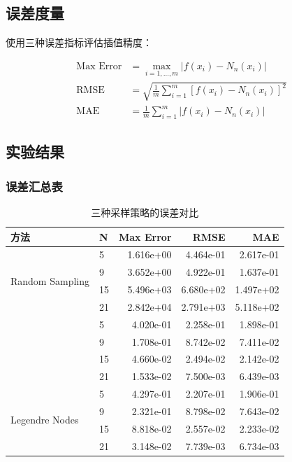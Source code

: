 \documentclass[a4paper,12pt]{article}
\theoremstyle{definition}
\begin{document}
\subsection{误差度量}

使用三种误差指标评估插值精度：

\begin{align}
\text{Max Error} &= \max_{i=1,\ldots,m}|f(x_i) - N_n(x_i)| \\
\text{RMSE} &= \sqrt{\frac{1}{m}\sum_{i=1}^{m}[f(x_i) - N_n(x_i)]^2} \\
\text{MAE} &= \frac{1}{m}\sum_{i=1}^{m}|f(x_i) - N_n(x_i)|
\end{align}

\subsection{实验结果}

\subsubsection{误差汇总表}

\begin{table}[H]
\centering
\caption{三种采样策略的误差对比}
\label{tab:task1_errors}
\begin{tabular}{llrrr}
\toprule
\textbf{方法} & \textbf{N} & \textbf{Max Error} & \textbf{RMSE} & \textbf{MAE} \\
\midrule
\multirow{4}{*}{Random Sampling}
& 5  & 1.616e+00 & 4.464e-01 & 2.617e-01 \\
& 9  & 3.652e+00 & 4.922e-01 & 1.637e-01 \\
& 15 & 5.496e+03 & 6.680e+02 & 1.497e+02 \\
& 21 & 2.842e+04 & 2.791e+03 & 5.118e+02 \\
\midrule
\rowcolor{tablerowcolor}
\multirow{4}{*}{Chebyshev Nodes}
& 5  & 4.020e-01 & 2.258e-01 & 1.898e-01 \\
& 9  & 1.708e-01 & 8.742e-02 & 7.411e-02 \\
& 15 & 4.660e-02 & 2.494e-02 & 2.142e-02 \\
& 21 & 1.533e-02 & 7.500e-03 & 6.439e-03 \\
\midrule
\multirow{4}{*}{Legendre Nodes}
& 5  & 4.297e-01 & 2.207e-01 & 1.906e-01 \\
& 9  & 2.321e-01 & 8.798e-02 & 7.643e-02 \\
& 15 & 8.818e-02 & 2.557e-02 & 2.233e-02 \\
& 21 & 3.148e-02 & 7.739e-03 & 6.734e-03 \\
\bottomrule
\end{tabular}
\end{table}
\end{document}
